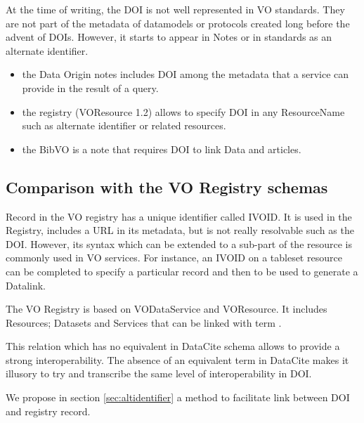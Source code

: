 \documentclass[11pt,a4paper]{ivoa}
\newcommand{\dataciteterm}[1]{\colorbox{lightgray}{DataCite:\textbf{#1}}}
\begin{document}
At the time of writing, the DOI is not well represented in VO standards. They are not part of the metadata of datamodels or protocols created long before the advent of DOIs.
However, it starts to appear in Notes or in standards as an alternate identifier.


\begin {itemize}
\item the Data Origin \citep{note:dataorigin} notes includes DOI among the metadata that a service can provide in the result of a query.
\item the registry \citep{std:registry} (VOResource 1.2) allows to specify DOI in any ResourceName such as alternate identifier or related resources.
\item the BibVO \citep{note:bibvo} is a note that requires DOI to link Data and articles.
\end{itemize}


\subsection{Comparison with the VO Registry schemas}
 Record in the VO registry has a unique identifier called IVOID. It is used in the Registry, includes a URL in its metadata, but is not really resolvable such as the DOI. However, its syntax which can be extended to a sub-part of the resource is commonly used in VO services. For instance, an IVOID on a tableset resource can be completed to specify a particular record and then to be used to generate a Datalink.
 
 The VO Registry is  based on VODataService and VOResource. It includes Resources; Datasets and Services that can be linked with term . 
 
 This relation which has no equivalent in DataCite schema allows to provide a strong interoperability. The absence of an equivalent term in DataCite makes it illusory to try and transcribe the same level of interoperability in DOI.\\
 
 
 
 We propose in section \ref{sec:altidentifier} a method to facilitate link between DOI and registry record.\\
 
\end{document}
